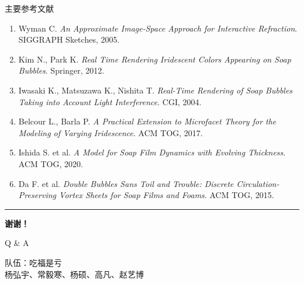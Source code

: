 \documentclass[aspectratio=169,10pt]{ctexbeamer}
\begin{document}
\begin{frame}{主要参考文献}
  \small
  \begin{enumerate}\setlength\itemsep{0.48em}
    \item Wyman C. \textit{An Approximate Image-Space Approach for Interactive Refraction}. SIGGRAPH Sketches, 2005.
    \item Kim N., Park K. \textit{Real Time Rendering Iridescent Colors Appearing on Soap Bubbles}. Springer, 2012.
    \item Iwasaki K., Matsuzawa K., Nishita T. \textit{Real-Time Rendering of Soap Bubbles Taking into Account Light Interference}. CGI, 2004.
    \item Belcour L., Barla P. \textit{A Practical Extension to Microfacet Theory for the Modeling of Varying Iridescence}. ACM TOG, 2017.
    \item Ishida S. et al. \textit{A Model for Soap Film Dynamics with Evolving Thickness}. ACM TOG, 2020.
    \item Da F. et al. \textit{Double Bubbles Sans Toil and Trouble: Discrete Circulation-Preserving Vortex Sheets for Soap Films and Foams}. ACM TOG, 2015.
  \end{enumerate}
\end{frame}

{
\begin{frame}[plain]
  \vfill
  \begin{center}
    \begin{minipage}{0.55\textwidth}
      \centering
      {\color{Cyan}\rule{1.05cm}{2pt}}\par
      \vspace{0.55cm}
      {\fontsize{28}{34}\selectfont\bfseries\color{Navy}谢谢！}\par
      \vspace{0.35cm}
      {\large\color{Blue}Q \& A}\par
      \vspace{0.8cm}
      {\small\color{Gray}
      队伍：吃福是亏\\
      杨弘宇、常毅寒、杨硕、高凡、赵艺博}
    \end{minipage}
  \end{center}
  \vfill
\end{frame}}
\end{document}
